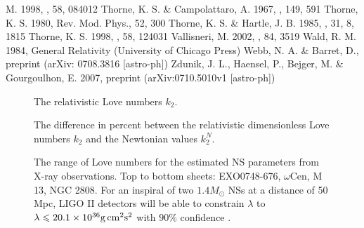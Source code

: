 \documentclass[12pt,preprint]{aastex}
\begin{document}
{\begin{thebibliography}{}
M. 1998, \prd, 58, 084012
 Thorne, K. S. \& Campolattaro, A.  1967, \apj, 149, 591
 Thorne, K. S. 1980, Rev. Mod. Phys., 52, 300
 Thorne, K. S. \&
Hartle, J. B. 1985, \prd, 31, 8, 1815
 Thorne, K. S.  1998, \prd, 58,
124031
 Vallisneri, M. 2002, \prl, 84, 3519
Wald, R. M. 1984, { General Relativity} (University of Chicago
Press)
 Webb, N. A. \& Barret, D., preprint
(arXiv: 0708.3816 [astro-ph])
Zdunik, J. L., Haensel, P., Bejger, M. \& Gourgoulhon, E. 2007,
preprint (arXiv:0710.5010v1 [astro-ph])
\end{thebibliography}

\clearpage


\begin{figure}
  \caption{The relativistic Love
numbers $k_2$. } \label{dimlam}
\end{figure}


\begin{figure}
  \caption{The difference in percent
between the relativistic dimensionless Love numbers $k_2$ and the
Newtonian values $k_2^N$.}\label{diff}
\end{figure}



\begin{figure}
  \caption{ The range of Love numbers
for the estimated NS parameters from X-ray observations. Top to
bottom sheets: EXO0748-676, $\omega$Cen, M 13, NGC 2808. For an
inspiral of two $1.4M_{\odot}$ NSs at a distance of 50 Mpc, LIGO II
detectors will be able to constrain $\lambda$ to $\lambda \leqslant
20.1 \times 10^{36} {\rm g}{\,}{\rm cm}^2{\rm s}^2 $ with $90\%$
confidence \citep{tidal}. }\label{xray}
\end{figure}


\clearpage

}
\end{document}
